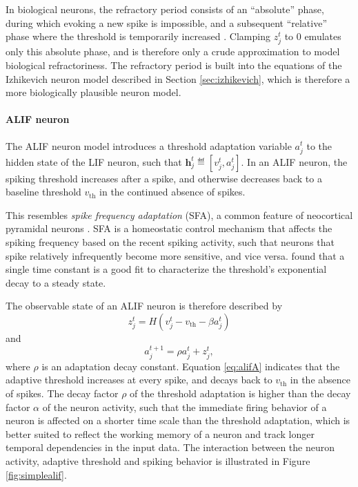             In biological neurons, the refractory period consists of an ``absolute'' phase, during which evoking a new spike is impossible, and a subsequent ``relative'' phase where the threshold is temporarily increased \citep{purves2008neuroscience}.
            Clamping $z^t_j$ to 0 emulates only this absolute phase, and is therefore only a crude approximation to model biological refractoriness.
            The refractory period is built into the equations of the Izhikevich neuron model described in Section \ref{sec:izhikevich}, which is therefore a more biologically plausible neuron model.


        \paragraph{ALIF neuron}
            The ALIF neuron model introduces a threshold adaptation variable $a^t_j$ to the hidden state of the LIF neuron, such that $\mathbf{h}^t_j \eqdef \left[v^t_j, a^t_j\right]$.
            In an ALIF neuron, the spiking threshold increases after a spike, and otherwise decreases back to a baseline threshold $v_\text{th}$ in the continued absence of spikes.

            This resembles \emph{spike frequency adaptation} (SFA), a common feature of neocortical pyramidal neurons \citep{benda2003universal}.
            SFA is a homeostatic control mechanism that affects the spiking frequency based on the recent spiking activity, such that neurons that spike relatively infrequently become more sensitive, and vice versa.
            \citet{ahmed1998estimates} found that a single time constant is a good fit to characterize the threshold's exponential decay to a steady state.

            The observable state of an ALIF neuron is therefore described by
            \begin{equation}\label{eq:alifZ}
            z^t_j = H\left(v_j^t - v_\text{th} - \beta a^t_j\right)
            \end{equation}
            and
            \begin{equation}\label{eq:alifA}
            a^{t+1}_j = \rho a^t_j + z^t_j,
            \end{equation}
            where $\rho$ is an adaptation decay constant.
            Equation \ref{eq:alifA} indicates that the adaptive threshold increases at every spike, and decays back to $v_\text{th}$ in the absence of spikes.
            The decay factor $\rho$ of the threshold adaptation is higher than the decay factor $\alpha$ of the neuron activity, such that the immediate firing behavior of a neuron is affected on a shorter time scale than the threshold adaptation, which is better suited to reflect the working memory of a neuron and track longer temporal dependencies in the input data.
            The interaction between the neuron activity, adaptive threshold and spiking behavior is illustrated in Figure \ref{fig:simplealif}.

